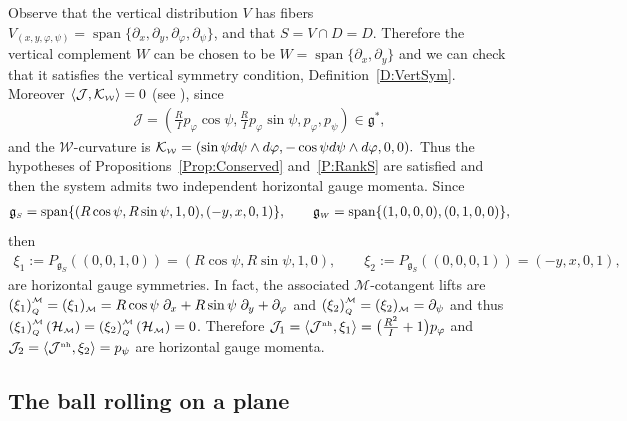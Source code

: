 \documentclass[pdftex]{sigma}
\numberwithin{equation}{section}
\def\W{\mathcal{W}}
\def\M{\mathcal{M}}
\def\J{\mathcal{J}}
\def\Ham{\mathcal{H}}
\def\g{\mathfrak{g}}
\def\nh{{\mbox{\tiny{nh}}}}
\def\subW{{\mbox{\tiny{$\W$}}}}
\def\subM{{\mbox{\tiny{$\M$}}}}
\def\subSS{{\mbox{\tiny{$S$}}}}
\def\subWW{{\mbox{\tiny{$W$}}}}
\def\subQQ{{\mbox{\tiny{$Q$}}}}
\begin{document}
Observe that the vertical distribution $V$ has f\/ibers $V_{(x,y,\varphi,\psi)} = \operatorname{span} \{ \partial_x,\partial_y,
\partial_\varphi,\partial_\psi \}$, and that $S = V\cap D = D$.
Therefore the vertical complement $W$ can be chosen to be $W=\operatorname{span}\{ \partial_x, \partial_y\}$ and we can check that it satisf\/ies the vertical symmetry condition, Def\/inition~\ref{D:VertSym}. Moreover $\langle \J, \mathcal{K}_\subW \rangle = 0$ (see \cite{Paula}), since
\begin{gather*}
\J = \left(\frac{R}{I} p_\varphi \cos\psi , \frac{R}{I} p_\varphi \sin\psi,p_\varphi,p_\psi \right)  \in \g^*,
\end{gather*}
and the $\W$-curvature is $\mathcal{K}_\subW =(\sin \psi   d\psi \wedge d\varphi
  , -\cos \psi   d\psi \wedge d\varphi   , 0, 0 ).$
Thus the hypotheses of Propositions~\ref{Prop:Conserved} and~\ref{P:RankS} are satisf\/ied and then the system admits two independent horizontal gauge
momenta.
Since
\begin{gather*}
\g_\subSS = \operatorname{span} \{(R\cos\psi,R\sin\psi,1,0),  (-y,x,0,1)\}, \qquad   \g_\subWW = \operatorname{span} \{(1,0,0,0),  (0,1,0,0)\},
\end{gather*} then
\begin{gather*}
     \xi_1 := P_{\g_S} ((0,0,1,0)) = (R\cos\psi,R\sin\psi,1,0), \qquad
     \xi_2 := P_{\g_S} ((0,0,0,1)) = (-y,x,0,1),
 \end{gather*}
are horizontal gauge symmetries.
In fact, the associated $\M$-cotangent lifts are
$\left(\xi_1\right)_\subQQ^\subM = (\xi_1)_\subM = R\cos\psi \; \partial_x+ R\sin\psi \; \partial_y + \partial_\varphi$
and $\left(\xi_2\right)_\subQQ^\subM = (\xi_2)_\subM =  \partial_\psi$ and thus $\left(\xi_1\right)_\subQQ^\subM (\Ham_\subM) = \left(\xi_2\right)_\subQQ^\subM (\Ham_\subM) = 0$.
Therefore $\J_1 =  \langle \J^{\nh},\xi_1\rangle = \big(\frac{R^2}{I}+1\big)  p_\varphi$
and $\J_2 =  \langle \J^{\nh}, \xi_2\rangle = p_\psi$ are
horizontal gauge momenta.

\subsection{The ball rolling on a plane}\label{Ex:Ball}
\end{document}
